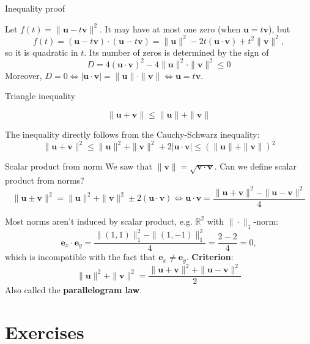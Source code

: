 \documentclass[10pt]{beamer}
\begin{document}
\begin{frame}{Inequality proof}
    \begin{center}
        
    \end{center}
    Let $f(t) = \|\mathbf u - t \mathbf v\|^2$. It may have at most one zero (when $\mathbf u = t \mathbf v$), but
    $$
    f(t) = (\mathbf u - t \mathbf v)\cdot (\mathbf u - t \mathbf v) = \|\mathbf u\|^2 - 2t(\mathbf u \cdot \mathbf v) + t^2 \|\mathbf v\|^2,
    $$
    so it is quadratic in $t$. Its number of zeros is determined by the sign of
    $$
    D = 4(\mathbf u \cdot \mathbf v)^2 - 4 \|\mathbf u\|^2 \cdot \|\mathbf v\|^2 \leq 0
    $$
    Moreover, $D=0 \iff |\mathbf u \cdot \mathbf v| = \|\mathbf u\| \cdot \|\mathbf v\| \iff \mathbf u = t \mathbf v$.
\end{frame}

\begin{frame}{Triangle inequality}
    \begin{center}
        
    \end{center}
    $$\|\mathbf u + \mathbf v \| \leq \|\mathbf u\| + \|\mathbf v\|$$

    The inequality directly follows from the Cauchy-Schwarz inequality:
    $$\|\mathbf u + \mathbf v\|^2 \leq \|\mathbf u \|^2 + \|\mathbf v \|^2 + 2 |\mathbf u \cdot \mathbf v| \leq (\|\mathbf u\| + \|\mathbf v\|)^2$$
\end{frame}

\begin{frame}{Scalar product from norm}
    We saw that $\|\mathbf v\| = \sqrt{\mathbf v \cdot \mathbf v}$. Can we define scalar product from norms?
    $$
    \|\mathbf u \pm \mathbf v\|^2 = \|\mathbf u\|^2 + \|\mathbf v\|^2 \pm 2 (\mathbf u \cdot \mathbf v) \iff \mathbf u \cdot \mathbf v = \frac{\|\mathbf u + \mathbf v\|^2 - \|\mathbf u - \mathbf v\|^2}{4}
    $$

    Most norms aren't induced by scalar product, e.g. $\mathbb R^2$ with $\|\cdot \|_1$-norm:
    $$
    \mathbf e_x \cdot \mathbf e_y = \frac{\|(1,1)\|_1^2-\|(1,-1)\|^2_1}{4} = \frac{2-2}{4} = 0,
    $$
    which is incompatible with the fact that $\mathbf e_x \neq \mathbf e_y$. \textbf{Criterion}:
    $$
    \|\mathbf u\|^2+\|\mathbf v\|^2 = \frac{\|\mathbf u + \mathbf v\|^2+\|\mathbf u - \mathbf v\|^2}{2}
    $$
    Also called the \textbf{parallelogram law}.
\end{frame}

\section{Exercises}
\end{document}
